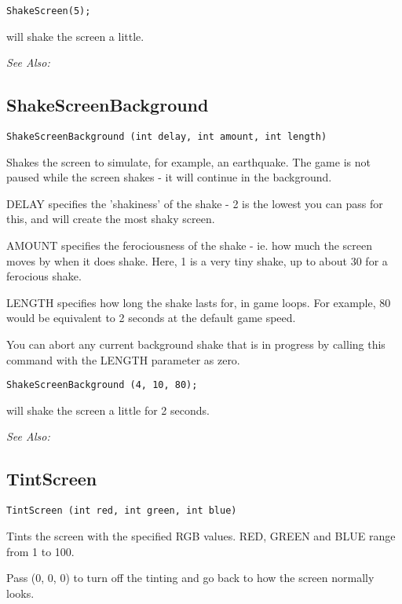 \begin{verbatim}
ShakeScreen(5);
\end{verbatim}
will shake the screen a little.

\it{See Also:} 


\subsection{ShakeScreenBackground}\label{ShakeScreenBackground}%

\begin{verbatim}
ShakeScreenBackground (int delay, int amount, int length)
\end{verbatim}
Shakes the screen to simulate, for example, an earthquake. The game is not paused
while the screen shakes - it will continue in the background.

DELAY specifies the 'shakiness' of the shake - 2 is the lowest you can pass for this,
and will create the most shaky screen.

AMOUNT specifies the ferociousness of the shake - ie. how much the screen moves by when it
does shake. Here, 1 is a very tiny shake, up to about 30 for a ferocious shake.

LENGTH specifies how long the shake lasts for, in game loops. For example, 80 would be
equivalent to 2 seconds at the default game speed.

You can abort any current background shake that is in progress by calling this command
with the LENGTH parameter as zero.

\begin{verbatim}
ShakeScreenBackground (4, 10, 80);
\end{verbatim}
will shake the screen a little for 2 seconds.

\it{See Also:} 


\subsection{TintScreen}\label{TintScreen}%

\begin{verbatim}
TintScreen (int red, int green, int blue)
\end{verbatim}
Tints the screen with the specified RGB values. RED, GREEN and BLUE range
from 1 to 100.

Pass (0, 0, 0) to turn off the tinting and go back to how the screen
normally looks.

